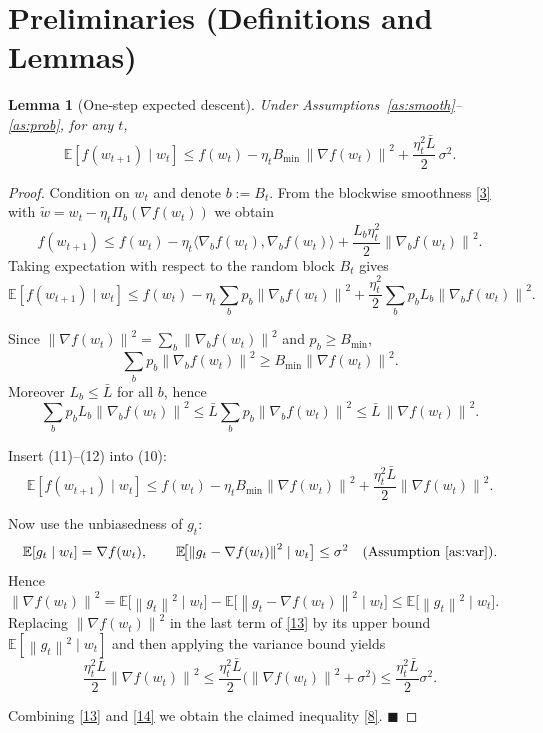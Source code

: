 \documentclass{article}
\newtheorem{lemma}{Lemma}
\newcommand{\E}{\mathbb{E}}
\newcommand{\norm}[1]{\left\|#1\right\|}
\begin{document}
\section*{Preliminaries (Definitions and Lemmas)}
\begin{lemma}[One‑step expected descent]\label{lem:descent}
Under Assumptions~\ref{as:smooth}–\ref{as:prob}, for any $t$,
\[
\E\!\left[ f(w_{t+1})\mid w_{t}\right]
\le f(w_{t})
-\eta_{t}B_{\min}\,\norm{\nabla f(w_{t})}^{2}
+\frac{\eta_{t}^{2}\bar L}{2}\,\sigma^{2}.
\tag{8}
\]
\end{lemma}
\begin{proof}
Condition on $w_{t}$ and denote $b:=B_{t}$.  
From the blockwise smoothness \eqref{3} with $\tilde w = w_{t}-\eta_{t}\Pi_{b}(\nabla f(w_{t}))$ we obtain
\[
f(w_{t+1})
\le f(w_{t})-\eta_{t}\langle\nabla_{b}f(w_{t}),\nabla_{b}f(w_{t})\rangle
+\frac{L_{b}\eta_{t}^{2}}{2}\norm{\nabla_{b}f(w_{t})}^{2}.
\tag{9}
\]
Taking expectation with respect to the random block $B_{t}$ gives
\[
\E\!\left[f(w_{t+1})\mid w_{t}\right]
\le f(w_{t})
-\eta_{t}\sum_{b}p_{b}\norm{\nabla_{b}f(w_{t})}^{2}
+\frac{\eta_{t}^{2}}{2}\sum_{b}p_{b}L_{b}\norm{\nabla_{b}f(w_{t})}^{2}.
\tag{10}
\]

Since $\norm{\nabla f(w_{t})}^{2}= \sum_{b}\norm{\nabla_{b}f(w_{t})}^{2}$ and $p_{b}\ge B_{\min}$,
\[
\sum_{b}p_{b}\norm{\nabla_{b}f(w_{t})}^{2}\ge B_{\min}\norm{\nabla f(w_{t})}^{2}.
\tag{11}
\]
Moreover $L_{b}\le\bar L$ for all $b$, hence
\[
\sum_{b}p_{b}L_{b}\norm{\nabla_{b}f(w_{t})}^{2}
\le\bar L\sum_{b}p_{b}\norm{\nabla_{b}f(w_{t})}^{2}
\le\bar L\,\norm{\nabla f(w_{t})}^{2}.
\tag{12}
\]

Insert (11)–(12) into (10):
\[
\E\!\left[f(w_{t+1})\mid w_{t}\right]
\le f(w_{t})
-\eta_{t}B_{\min}\norm{\nabla f(w_{t})}^{2}
+\frac{\eta_{t}^{2}\bar L}{2}\norm{\nabla f(w_{t})}^{2}.
\tag{13}
\]

Now use the unbiasedness of $g_{t}$:
\[
\E[g_{t}\mid w_{t}]=\nabla f(w_{t}),
\qquad
\E\!\bigl[\norm{g_{t}-\nabla f(w_{t})}^{2}\mid w_{t}\bigr]\le\sigma^{2}
\quad\text{(Assumption~\ref{as:var})}.
\]
Hence $\norm{\nabla f(w_{t})}^{2}
= \E\!\bigl[\norm{g_{t}}^{2}\mid w_{t}\bigr]-\E\!\bigl[\norm{g_{t}-\nabla f(w_{t})}^{2}\mid w_{t}\bigr]
\le \E\!\bigl[\norm{g_{t}}^{2}\mid w_{t}\bigr]$.
Replacing $\norm{\nabla f(w_{t})}^{2}$ in the last term of \eqref{13} by its upper bound
$\E[\norm{g_{t}}^{2}\mid w_{t}]$ and then applying the variance bound yields
\[
\frac{\eta_{t}^{2}\bar L}{2}\norm{\nabla f(w_{t})}^{2}
\le \frac{\eta_{t}^{2}\bar L}{2}\bigl(\norm{\nabla f(w_{t})}^{2}+\sigma^{2}\bigr)
\le \frac{\eta_{t}^{2}\bar L}{2}\sigma^{2}.
\tag{14}
\]

Combining \eqref{13} and \eqref{14} we obtain the claimed inequality \eqref{8}.
\hfill$\blacksquare$
\end{proof}
\end{document}
